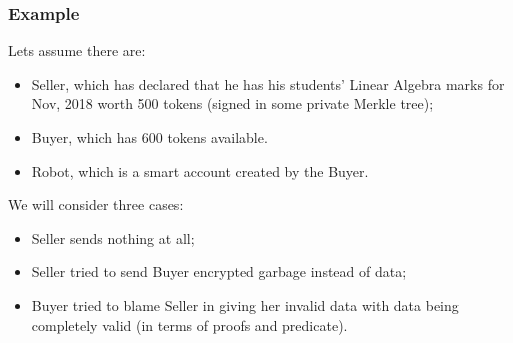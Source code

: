 \subsubsection{Example}

Lets assume there are:
\begin{itemize}
  \item Seller, which has declared that he has his students' Linear Algebra marks for Nov, 2018 worth 500 tokens (signed in some private Merkle tree);
  \item Buyer, which has 600 tokens available.
  \item Robot, which is a smart account created by the Buyer.
\end{itemize}

We will consider three cases:
\begin{itemize}
  \item Seller sends nothing at all;
  \item Seller tried to send Buyer encrypted garbage instead of data;
  \item Buyer tried to blame Seller in giving her invalid data with data being completely valid (in terms of proofs and predicate).
\end{itemize}

